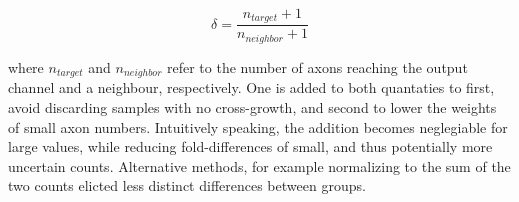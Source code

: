 \begin{equation}
    \delta = \frac{n_{target}+1}{n_{neighbor}+1}
    \label{folddiff}
\end{equation}

where $n_{target}$ and $n_{neighbor}$ refer to the number of axons reaching the
output channel and a neighbour, respectively. One is added to both quantaties to
first, avoid discarding samples with no cross-growth, and second to lower the
weights of small axon numbers. Intuitively speaking, the addition becomes
neglegiable for large values, while reducing fold-differences of small, and thus
potentially more uncertain counts. Alternative methods, for example normalizing
to the sum of the two counts elicted less distinct differences between groups.
















